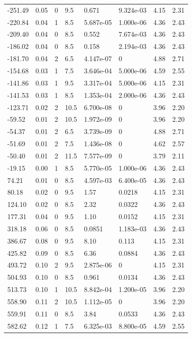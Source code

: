 \documentclass[preview]{standalone}
\begin{document}
{{\begin{tabular}{L{1.2cm}C{1.2cm} C{0.3cm}C{0.5cm} C{1.4cm}C{1.4cm} C{1.4cm}C{1.4cm}}
  -251.49  &  0.05  & 0     & 9.5 &  0.671  & 9.324e-03  & 4.15 &  2.31   \\ 
  -220.84  &  0.04  & 1     & 8.5 &  5.687e-05  & 1.000e-06  & 4.36 &  2.43   \\ 
  -209.40  &  0.04  & 0     & 8.5 &  0.552  & 7.674e-03  & 4.36 &  2.43   \\ 
  -186.02  &  0.04  & 0     & 8.5 &  0.158  & 2.194e-03  & 4.36 &  2.43   \\ 
  -181.70  &  0.04  & 2     & 6.5 &  4.147e-07  & 0  & 4.88 &  2.71   \\ 
  -154.68  &  0.03  & 1     & 7.5 &  3.646e-04  & 5.000e-06  & 4.59 &  2.55   \\ 
  -141.86  &  0.03  & 1     & 9.5 &  3.317e-04  & 5.000e-06  & 4.15 &  2.31   \\ 
  -141.53  &  0.03  & 1     & 8.5 &  1.353e-04  & 2.000e-06  & 4.36 &  2.43   \\ 
  -123.71  &  0.02  & 2     & 10.5 &  6.700e-08  & 0  & 3.96 &  2.20   \\ 
  -59.52  &  0.01  & 2     & 10.5 &  1.972e-09  & 0  & 3.96 &  2.20   \\ 
  -54.37  &  0.01  & 2     & 6.5 &  3.739e-09  & 0  & 4.88 &  2.71   \\ 
  -51.69  &  0.01  & 2     & 7.5 &  1.436e-08  & 0  & 4.62 &  2.57   \\ 
  -50.40  &  0.01  & 2     & 11.5 &  7.577e-09  & 0  & 3.79 &  2.11   \\ 
  -19.15  &  0.00  & 1     & 8.5 &  5.770e-05  & 1.000e-06  & 4.36 &  2.43   \\ 
  74.21  &  0.01  & 0     & 8.5 &  4.597e-03  & 6.400e-05  & 4.36 &  2.43   \\ 
  80.18  &  0.02  & 0     & 9.5 &  1.57  & 0.0218  & 4.15 &  2.31   \\ 
  124.10  &  0.02  & 0     & 8.5 &  2.32  & 0.0322  & 4.36 &  2.43   \\ 
  177.31  &  0.04  & 0     & 9.5 &  1.10  & 0.0152  & 4.15 &  2.31   \\ 
  318.18  &  0.06  & 0     & 8.5 &  0.0851  & 1.183e-03  & 4.36 &  2.43   \\ 
  386.67  &  0.08  & 0     & 9.5 &  8.10  & 0.113  & 4.15 &  2.31   \\ 
  425.82  &  0.09  & 0     & 8.5 &  6.36  & 0.0884  & 4.36 &  2.43   \\ 
  493.72  &  0.10  & 2     & 9.5 &  2.875e-06  & 0  & 4.15 &  2.31   \\ 
  504.93  &  0.10  & 0     & 8.5 &  0.961  & 0.0134  & 4.36 &  2.43   \\ 
  513.73  &  0.10  & 1     & 10.5 &  8.842e-04  & 1.200e-05  & 3.96 &  2.20   \\ 
  558.90  &  0.11  & 2     & 10.5 &  1.112e-05  & 0  & 3.96 &  2.20   \\ 
  559.91  &  0.11  & 0     & 8.5 &  3.84  & 0.0533  & 4.36 &  2.43   \\ 
  582.62  &  0.12  & 1     & 7.5 &  6.325e-03  & 8.800e-05  & 4.59 &  2.55   \\ 
\hline 
\end{tabular} 

}}
\end{document}
